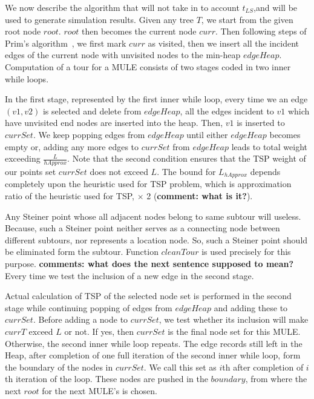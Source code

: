 We now describe the algorithm that will not take in to account $t_{LS}$,and will be used to generate simulation results. Given any tree $T$, we start from the given root node $root$. $root$ then becomes the current node $curr$. Then following steps of Prim's algorithm~\cite{Prim}, we first mark $curr$ as visited, then we insert all the incident edges of the current node with unvisited nodes to the min-heap $edgeHeap$. Computation of a tour for a MULE consists of two stages coded in two inner while loops.

In the first stage, represented by the first inner while loop, every time we an edge $(v1,v2)$ is selected and delete from $edgeHeap$, all the edges incident to $v1$ which have unvisited end nodes are inserted into the heap. Then, $v1$ is inserted to $currSet$. We keep popping edges from $edgeHeap$ until either $edgeHeap$ becomes empty or, adding any more edges to $currSet$ from $edgeHeap$ leads to total weight exceeding $\frac{L}{hApprox}$. Note that the second condition ensures that the TSP weight of our points set $currSet$ does not exceed $L$. The bound for $L_{hApprox}$ depends completely upon the heuristic used for TSP problem, which is approximation ratio of the heuristic used for TSP, $\times$ 2 ({\bf comment: what is it?}).

Any Steiner point whose all adjacent nodes belong to same subtour will useless. Because, such a Steiner point neither serves as a connecting node between different subtours, nor represents a location node. So, such a Steiner point should be eliminated form the subtour. Function $cleanTour$ is used precisely for this purpose. {\bf comments: what does the next sentence supposed to mean?} Every time we test the inclusion of a new edge in the second stage.

Actual calculation of TSP of the selected node set is performed in the second stage while  %
continuing popping of edges from $edgeHeap$ and adding these to $currSet$. Before adding a node to $currSet$, we test whether its inclusion will make $currT$ exceed $L$ or not. If yes, then $currSet$ is the final node set for this MULE. Otherwise, the second inner while loop repeats. %
The edge records still left in the Heap, after completion of one full iteration of the second inner while loop, form the boundary of the nodes in $currSet$. We call this set as $i$th after completion of $i$th iteration of the loop. %
These nodes are pushed in the $boundary$, from where the next $root$ for the next MULE's is chosen.%



